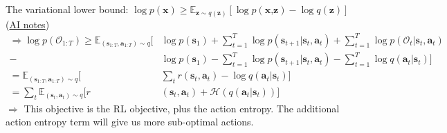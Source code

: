 The variational lower bound: $\log p(\textbf{x}) \geq \mathbb{E}_{\textbf{z} \sim q(\textbf{z})} [\log p(\textbf{x,z}) - \log q(\textbf{z})]$ (\href{AI_notes.pdf}{AI notes})
\begin{align*}	
	\Rightarrow \log p(\mathcal{O}_{1:T}) \geq \mathbb{E}_{(\textbf{s}_{1:T}, \textbf{a}_{1:T}) \sim q} \Bigg[ &\log p(\textbf{s}_1) + \sum_{t=1}^T \log p(\textbf{s}_{t+1} | \textbf{s}_t, \textbf{a}_t) + \sum_{t=1}^T \log p(\mathcal{O}_t | \textbf{s}_t, \textbf{a}_t) \\
	-&\log p(\textbf{s}_1) - \sum_{t=1}^T \log p(\textbf{s}_{t+1} | \textbf{s}_t, \textbf{a}_t) - \sum_{t=1}^T \log q(\textbf{a}_t | \textbf{s}_t) \Bigg]\\
	= \mathbb{E}_{(\textbf{s}_{1:T}, \textbf{a}_{1:T}) \sim q} \Bigg[ & \sum_t r(\textbf{s}_t, \textbf{a}_t) - \log q(\textbf{a}_t | \textbf{s}_t) \Bigg]\\
	= \sum_t \mathbb{E}_{(\textbf{s}_t, \textbf{a}_t) \sim q}  [r&(\textbf{s}_t, \textbf{a}_t) + \mathcal{H}(q(\textbf{a}_t | \textbf{s}_t))]
\end{align*}
$\Rightarrow$ This objective is the \ac{RL} objective, plus the action entropy. The additional action entropy term will give us more sub-optimal actions.

